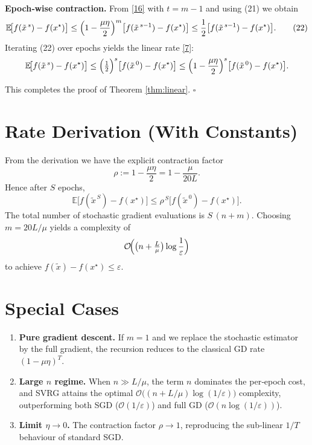 \documentclass[11pt]{article}
\begin{document}
\begin{enumerate}[label={[\textbf{Step \arabic*}]}]
\item \textbf{Epoch‑wise contraction.}  
From \eqref{16} with $t=m-1$ and using (21) we obtain
\[
\mathbb{E}\!\bigl[f(\tilde{x}^{\,s})-f(x^\star)\bigr]
\le\Bigl(1-\frac{\mu\eta}{2}\Bigr)^{m}
\bigl[f(\tilde{x}^{\,s-1})-f(x^\star)\bigr]
\le\frac12\bigl[f(\tilde{x}^{\,s-1})-f(x^\star)\bigr].
\tag{22}
\]
Iterating (22) over epochs yields the linear rate \eqref{7}:
\[
\mathbb{E}\!\bigl[f(\tilde{x}^{\,s})-f(x^\star)\bigr]
\le\Bigl(\tfrac12\Bigr)^{s}
\bigl[f(\tilde{x}^{\,0})-f(x^\star)\bigr]
\le\Bigl(1-\frac{\mu\eta}{2}\Bigr)^{s}
\bigl[f(\tilde{x}^{\,0})-f(x^\star)\bigr].
\]
\end{enumerate}
This completes the proof of Theorem \ref{thm:linear}. \hfill $\square$

\section*{Rate Derivation (With Constants)}
From the derivation we have the explicit contraction factor
\[
\rho := 1-\frac{\mu\eta}{2}
= 1-\frac{\mu}{20L}.
\tag{23}
\]
Hence after $S$ epochs,
\[
\mathbb{E}\!\bigl[f(\tilde{x}^{\,S})-f(x^\star)\bigr]
\le \rho^{\,S}\bigl[f(\tilde{x}^{\,0})-f(x^\star)\bigr].
\tag{24}
\]
The total number of stochastic gradient evaluations is $S\,(n+m)$.  Choosing $m=20L/\mu$ yields a complexity of
\[
\mathcal{O}\!\Bigl(\bigl(n+ \tfrac{L}{\mu}\bigr)\log\frac{1}{\varepsilon}\Bigr)
\]
to achieve $f(\tilde{x})-f(x^\star)\le\varepsilon$.

\section*{Special Cases}
\begin{enumerate}[label={\arabic*.}]
\item \textbf{Pure gradient descent.}  If $m=1$ and we replace the stochastic estimator by the full gradient, the recursion reduces to the classical GD rate $(1-\mu\eta)^{T}$.
\item \textbf{Large $n$ regime.}  When $n\gg L/\mu$, the term $n$ dominates the per‑epoch cost, and SVRG attains the optimal $\mathcal{O}\bigl((n+L/\mu)\log(1/\varepsilon)\bigr)$ complexity, outperforming both SGD ($\mathcal{O}(1/\varepsilon)$) and full GD ($\mathcal{O}(n\log(1/\varepsilon))$).
\item \textbf{Limit $\eta\to 0$.}  The contraction factor $\rho\to 1$, reproducing the sub‑linear $1/T$ behaviour of standard SGD.
\end{enumerate}
\end{document}
